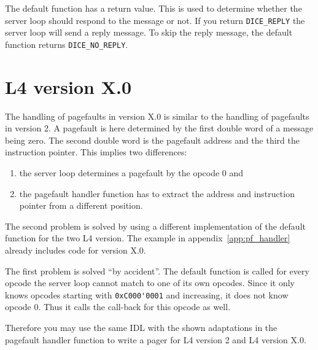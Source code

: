 The default function has a return value. This is used to determine
whether the server loop should respond to the message or not. If you 
return \verb|DICE_REPLY| the server loop will send a reply message.
To skip the reply message, the default function returns \verb|DICE_NO_REPLY|.

\section{L4 version X.0}
The handling of pagefaults in version X.0 is similar to the handling
of pagefaults in version 2. A pagefault is here determined by the
first double word of a message being zero. The second double word
is the pagefault address and the third the instruction pointer. This
implies two differences:

\begin{enumerate}
\item the server loop determines a pagefault by the opcode 0 and
\item the pagefault handler function has to extract the address and
instruction pointer from a different position.
\end{enumerate}

The second problem is solved by using a different implementation of the
default function for the two L4 version. The example in appendix~\ref{app:pf_handler}
already includes code for version X.0.

The first problem is solved ``by accident''. The default function
is called for every opcode the server loop cannot match to one of its
own opcodes. Since it only knows opcodes starting with \verb|0xC000'0001|
and increasing, it does not know opcode 0. Thus it calls the call-back
for this opcode as well.

Therefore you may use the same IDL with the shown adaptations in
the pagefault handler function to write a pager for L4 version 2 and
L4 version X.0.

